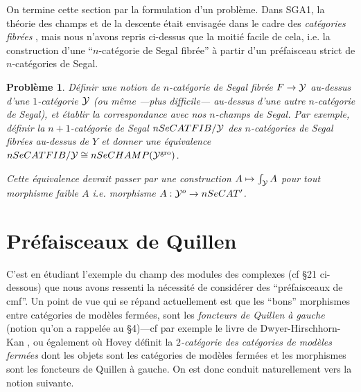 \documentclass[12pt]{article}
\newcommand{\numero}[1]{\newpage\section{#1}}
\newtheorem{probleme}[lemma]{Probl\`eme}
\newcommand{\Yy}{{\cal Y}}
\begin{document}
On termine cette section par la formulation d'un probl\`eme. Dans
SGA1, la th\'eorie des champs et de la descente \'etait envisag\'ee dans le
cadre
des {\em cat\'egories fibr\'ees} \cite{SGA1} \cite{GiraudThese}, mais nous
n'avons repris ci-dessus que la moiti\'e facile de cela, i.e. la construction
d'une ``$n$-cat\'egorie de Segal fibr\'ee'' \`a partir d'un pr\'efaisceau strict
de $n$-cat\'egories de Segal.

\begin{probleme}
\label{problemefibree}
D\'efinir une notion de {\em $n$-cat\'egorie de Segal fibr\'ee}
$F\rightarrow \Yy$ au-dessus d'une $1$-cat\'egorie $\Yy$ (ou m\^eme ---plus
difficile--- au-dessus d'une autre $n$-cat\'egorie de Segal), et \'etablir
la correspondance avec nos $n$-champs de Segal. Par exemple, d\'efinir la
$n+1$-cat\'egorie de Segal $nSeCATFIB /\Yy $ des $n$-cat\'egories de
Segal fibr\'ees au-dessus de $Y$ et donner une \'equivalence $nSeCATFIB
/\Yy \cong nSeCHAMP (\Yy ^{\rm gro})$.

Cette \'equivalence devrait passer par
une construction $A\mapsto \int _{\Yy} A$ pour tout morphisme faible $A$ i.e.
morphisme $A: \Yy ^o\rightarrow nSeCAT'$.
\end{probleme}




\numero{Pr\'efaisceaux de Quillen}

\label{quipage}

C'est en \'etudiant l'exemple du champ des modules des complexes (cf
\S 21 ci-dessous) que nous avons ressenti la n\'ecessit\'e de consid\'erer des
``pr\'efaisceaux
de cmf''.
Un point de vue qui se r\'epand actuellement est que les ``bons''
morphismes entre
cat\'egories de mod\`eles ferm\'ees, sont les {\em foncteurs de Quillen \`a
gauche} (notion qu'on a rappel\'ee au \S 4)---cf par exemple le livre de
Dwyer-Hirschhorn-Kan \cite{DHK}, ou \'egalement
\cite{HoveyBook} o\`u Hovey d\'efinit la {\em $2$-cat\'egorie des
cat\'egories de mod\`eles ferm\'ees} dont les objets sont les cat\'egories de
mod\`eles ferm\'ees et les morphismes sont les foncteurs de Quillen \`a
gauche.
On est donc conduit naturellement vers la notion suivante.
\end{document}
